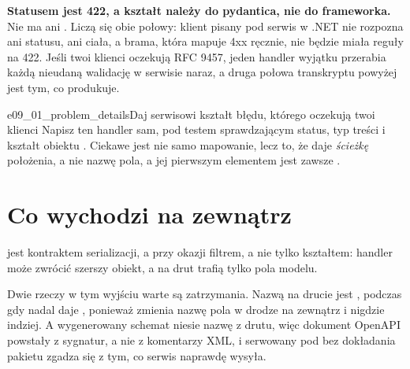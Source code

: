 
\begin{trapbox}
\textbf{Statusem jest 422, a kształt należy do pydantica, nie do
frameworka.} Nie ma  ani
. Liczą się obie połowy: klient pisany
pod serwis w .NET nie rozpozna ani statusu, ani ciała, a brama, która mapuje
4xx ręcznie, nie będzie miała reguły na 422. Jeśli twoi klienci oczekują
RFC 9457, jeden handler wyjątku przerabia każdą nieudaną walidację w serwisie
naraz, a druga połowa transkryptu powyżej jest tym, co produkuje.
\end{trapbox}


\begin{exercise}{e09_01_problem_details}{Daj serwisowi kształt błędu, którego oczekują twoi klienci}
Napisz ten handler sam, pod testem sprawdzającym status, typ treści i kształt
obiektu . Ciekawe jest nie samo mapowanie, lecz to, że
 daje \emph{ścieżkę} położenia, a nie nazwę pola, a jej
pierwszym elementem jest zawsze .
\end{exercise}

\section{Co wychodzi na zewnątrz}
\label{sec:ch09-serialisation}

 jest kontraktem serializacji, a przy okazji filtrem, a
nie tylko kształtem: handler może zwrócić szerszy obiekt, a na drut trafią
tylko pola modelu.




\noindent
Dwie rzeczy w tym wyjściu warte są zatrzymania. Nazwą na drucie jest
, podczas gdy  nadal daje
, ponieważ  zmienia nazwę pola
w drodze na zewnątrz i nigdzie indziej. A wygenerowany schemat niesie nazwę z
drutu, więc dokument OpenAPI \dash{} powstały z sygnatur, a nie z komentarzy
XML, i serwowany pod  bez dokładania pakietu \dash{}
zgadza się z tym, co serwis naprawdę wysyła.


